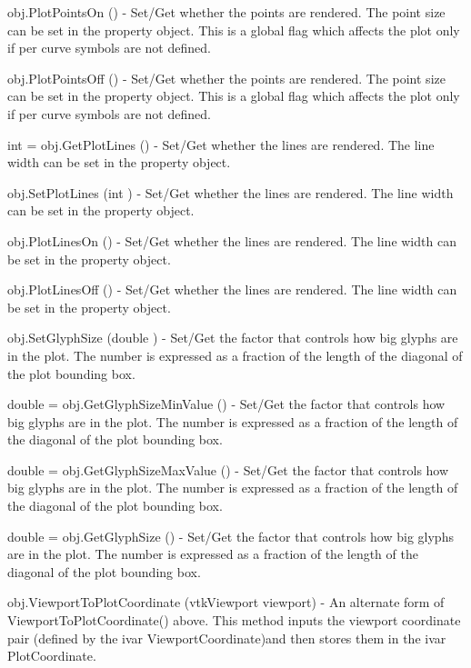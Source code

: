 \begin{DoxyItemize}
\item {\ttfamily obj.\-Plot\-Points\-On ()} -\/ Set/\-Get whether the points are rendered. The point size can be set in the property object. This is a global flag which affects the plot only if per curve symbols are not defined.  
\item {\ttfamily obj.\-Plot\-Points\-Off ()} -\/ Set/\-Get whether the points are rendered. The point size can be set in the property object. This is a global flag which affects the plot only if per curve symbols are not defined.  
\item {\ttfamily int = obj.\-Get\-Plot\-Lines ()} -\/ Set/\-Get whether the lines are rendered. The line width can be set in the property object.  
\item {\ttfamily obj.\-Set\-Plot\-Lines (int )} -\/ Set/\-Get whether the lines are rendered. The line width can be set in the property object.  
\item {\ttfamily obj.\-Plot\-Lines\-On ()} -\/ Set/\-Get whether the lines are rendered. The line width can be set in the property object.  
\item {\ttfamily obj.\-Plot\-Lines\-Off ()} -\/ Set/\-Get whether the lines are rendered. The line width can be set in the property object.  
\item {\ttfamily obj.\-Set\-Glyph\-Size (double )} -\/ Set/\-Get the factor that controls how big glyphs are in the plot. The number is expressed as a fraction of the length of the diagonal of the plot bounding box.  
\item {\ttfamily double = obj.\-Get\-Glyph\-Size\-Min\-Value ()} -\/ Set/\-Get the factor that controls how big glyphs are in the plot. The number is expressed as a fraction of the length of the diagonal of the plot bounding box.  
\item {\ttfamily double = obj.\-Get\-Glyph\-Size\-Max\-Value ()} -\/ Set/\-Get the factor that controls how big glyphs are in the plot. The number is expressed as a fraction of the length of the diagonal of the plot bounding box.  
\item {\ttfamily double = obj.\-Get\-Glyph\-Size ()} -\/ Set/\-Get the factor that controls how big glyphs are in the plot. The number is expressed as a fraction of the length of the diagonal of the plot bounding box.  
\item {\ttfamily obj.\-Viewport\-To\-Plot\-Coordinate (vtk\-Viewport viewport)} -\/ An alternate form of Viewport\-To\-Plot\-Coordinate() above. This method inputs the viewport coordinate pair (defined by the ivar Viewport\-Coordinate)and then stores them in the ivar Plot\-Coordinate.  

\end{DoxyItemize}
